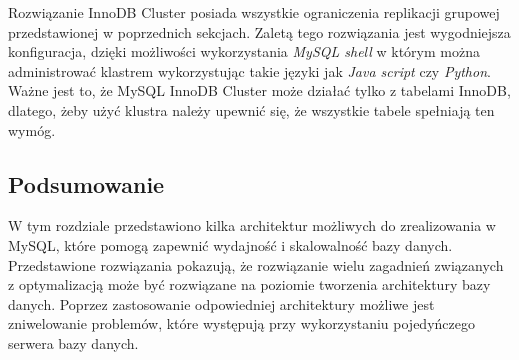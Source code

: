 Rozwiązanie InnoDB Cluster posiada wszystkie ograniczenia replikacji grupowej przedstawionej w poprzednich sekcjach. Zaletą tego rozwiązania jest wygodniejsza konfiguracja, dzięki możliwości wykorzystania \textit{MySQL shell} w którym można administrować klastrem wykorzystując takie języki jak \textit{Java script} czy \textit{Python}. Ważne jest to, że MySQL InnoDB Cluster może działać tylko z tabelami InnoDB, dlatego, żeby użyć klustra należy upewnić się, że wszystkie tabele spełniają ten wymóg.


\subsection{Podsumowanie}
W tym rozdziale przedstawiono kilka architektur możliwych do zrealizowania w MySQL, które pomogą zapewnić wydajność i skalowalność bazy danych. Przedstawione rozwiązania pokazują, że rozwiązanie wielu zagadnień związanych z optymalizacją może być rozwiązane na poziomie tworzenia architektury bazy danych. Poprzez zastosowanie odpowiedniej architektury możliwe jest zniwelowanie problemów, które występują przy wykorzystaniu pojedyńczego serwera bazy danych. 